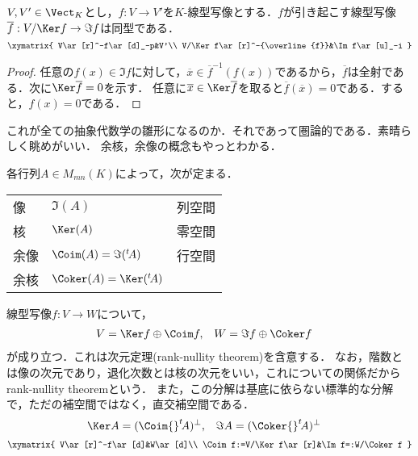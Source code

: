 \documentclass[uplatex, dvipdfmx]{jsreport}
\begin{document}
\begin{proposition}\label{prop-homomorphism-thm}
    $V,V'\in\Vect_K$とし，$f:V\to V'$を$K$-線型写像とする．$f$が引き起こす線型写像$\overline{f}:V/\Ker f\to\Im f$は同型である．
    \[\xymatrix{
        V\ar[r]^-f\ar[d]_-p&V'\\
        V/\Ker f\ar[r]^-{\overline{f}}&\Im f\ar[u]_-i
    }\]
\end{proposition}
\begin{proof}
    任意の$f(x)\in\Im f$に対して，$\overline{x}\in\overline{f}^{-1}(f(x))$であるから，$\overline{f}$は全射である．次に$\Ker\overline{f}=0$を示す．
    任意に$\overline{x}\in\Ker\overline{f}$を取ると$\overline{f}(\overline{x})=0$である．すると，$f(x)=0$である．
\end{proof}
\begin{remarks}
    これが全ての抽象代数学の雛形になるのか．それであって圏論的である．素晴らしく眺めがいい．
    余核，余像の概念もやっとわかる．
\end{remarks}

\begin{remark}
    各行列$A\in M_{mn}(K)$によって，次が定まる．
    \begin{tabular}{l|l|l}
        像&$\Im(A)$&列空間\\
        核&$\Ker(A)$&零空間\\
        余像&$\Coim(A)=\Im({}^t\!A)$&行空間\\
        余核&$\Coker(A)=\Ker({}^t\!A)$&
    \end{tabular}
    線型写像$f:V\to W$について，
    \begin{align*}
        V&=\Ker f\oplus\Coim f,&W&=\Im f\oplus\Coker f
    \end{align*}
    が成り立つ．これは次元定理(rank-nullity theorem)を含意する．
    なお，階数とは像の次元であり，退化次数とは核の次元をいい，これについての関係だからrank-nullity theoremという．
    また，この分解は基底に依らない標準的な分解で，ただの補空間ではなく，直交補空間である．
    \begin{align*}
        \Ker A&=(\Coim {}^t\!A)^\bot,&\Im A&=(\Coker {}^t\!A)^\bot
    \end{align*}
    \[\xymatrix{
        V\ar[r]^-f\ar[d]&W\ar[d]\\
        \Coim f:=V/\Ker f\ar[r]&\Im f=:W/\Coker f
    }\]
\end{remark}
\end{document}
